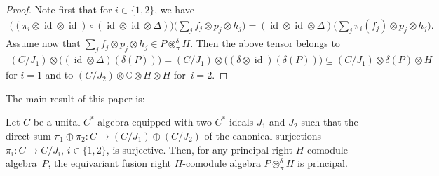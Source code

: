 \begin{proof}
Note f\/irst that for $i\in\{1,2\}$, we have
\begin{gather*}
\big((\pi_i\otimes\operatorname{id}\otimes\operatorname{id})\circ(\operatorname{id}\otimes\operatorname{id}\otimes\Delta)\big)\!\bigg(\sum_j f_j\otimes p_j\otimes h_j\bigg)
=(\operatorname{id}\otimes\operatorname{id}\otimes\Delta)\!\bigg(\sum_j \pi_i(f_j) \otimes p_j\otimes h_j\bigg).
\end{gather*}
Assume now that $\sum_j f_j\otimes p_j\otimes h_j\in P\circledast^\delta_\pi H$.
 Then the above tensor belongs to
\begin{gather*}
(C/J_1)\otimes \big((\operatorname{id}\otimes\Delta)(\delta(P))\big)=
(C/J_1)\otimes \big((\delta\otimes\operatorname{id})(\delta(P))\big)
\subseteq(C/J_1)\otimes \delta(P)\otimes H
\end{gather*}
for $i=1$ and to $(C/J_2)\otimes \mathbb{C}\otimes H\otimes H$ for~$i=2$.
\end{proof}

The main result of this paper is:
\begin{Theorem}\label{main}
Let $C$ be a unital $C^*$-algebra equipped with two $C^*$-ideals $J_1$ and $ J_2$
such that the direct sum
$
\pi_1\oplus\pi_2\colon C\rightarrow (C/J_1) \oplus (C/J_2)
$
of the canonical surjections $\pi_i\colon C\to C/J_i$, $i\in \{1,2\}$, is surjective.
Then, for any principal right $H$-comodule algebra~$P$,
 the equivariant fusion right $H$-comodule algebra $P{\circledast}^\delta_\pi H$ is principal.
\end{Theorem}

